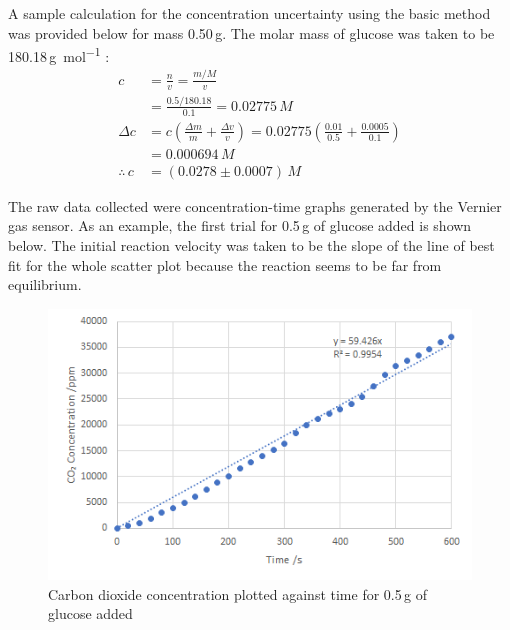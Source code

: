 \documentclass{article}
\begin{document}
A sample calculation for the concentration uncertainty using the basic method was provided below for mass 0.50\,\si{g}. The molar mass of glucose was taken to be 180.18\,\si{g.mol^{-1}} \parencite{data-booklet}:
\begin{align*}
    c &= \frac{n}{v} = \frac{m/M}{v} \\
    &= \frac{0.5/180.18}{0.1} = 0.02775\,\si{M} \\  %
    \Delta c &= c\left(\frac{\Delta m}{m} + \frac{\Delta v}{v}\right) = 0.02775\left(\frac{0.01}{0.5} + \frac{0.0005}{0.1}\right) \\
    &= 0.000694\,\si{M} \\
    \therefore\,c &= (0.0278 \pm 0.0007)\,\si{M}
\end{align*}

\newpage

The raw data collected were concentration-time graphs generated by the Vernier  gas sensor. As an example, the first trial for 0.5\,\si{g} of glucose added is shown below. The initial reaction velocity was taken to be the slope of the line of best fit for the whole scatter plot because the reaction seems to be far from equilibrium.  %
\begin{figure}[H]
    \renewcommand{\figurename}{Graph}
    \setcounter{figure}{1}
    \centering
    \includegraphics{figures/graph_02.png}
    \vspace*{-12pt}
    \caption{Carbon dioxide concentration plotted against time for 0.5\,\si{g} of glucose added}
    \label{fig:graph2}
\end{figure}
\end{document}
